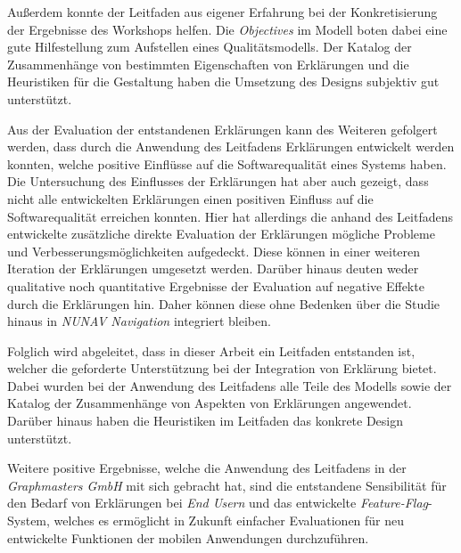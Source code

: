 Außerdem konnte der Leitfaden aus eigener Erfahrung bei der Konkretisierung der Ergebnisse des Workshops helfen. Die \textit{Objectives} im Modell boten dabei eine gute Hilfestellung zum Aufstellen eines Qualitätsmodells. Der Katalog der Zusammenhänge von bestimmten Eigenschaften von Erklärungen und die Heuristiken für die Gestaltung haben die Umsetzung des Designs subjektiv gut unterstützt.

Aus der Evaluation der entstandenen Erklärungen kann des Weiteren gefolgert werden, dass durch die Anwendung des Leitfadens Erklärungen entwickelt werden konnten, welche positive Einflüsse auf die Softwarequalität eines Systems haben. Die Untersuchung des Einflusses der Erklärungen hat aber auch gezeigt, dass nicht alle entwickelten Erklärungen einen positiven Einfluss auf die Softwarequalität erreichen konnten. Hier hat allerdings die anhand des Leitfadens entwickelte zusätzliche direkte Evaluation der Erklärungen mögliche Probleme und Verbesserungsmöglichkeiten aufgedeckt. Diese können in einer weiteren Iteration der Erklärungen umgesetzt werden. Darüber hinaus deuten weder qualitative noch quantitative Ergebnisse der Evaluation auf negative Effekte durch die Erklärungen hin. Daher können diese ohne Bedenken über die Studie hinaus in \textit{NUNAV Navigation} integriert bleiben.

Folglich wird abgeleitet, dass in dieser Arbeit ein Leitfaden entstanden ist, welcher die geforderte Unterstützung bei der Integration von Erklärung bietet. Dabei wurden bei der Anwendung des Leitfadens alle Teile des Modells sowie der Katalog der Zusammenhänge von Aspekten von Erklärungen angewendet. Darüber hinaus haben die Heuristiken im Leitfaden das konkrete Design unterstützt.

Weitere positive Ergebnisse, welche die Anwendung des Leitfadens in der \textit{Graphmasters GmbH} mit sich gebracht hat, sind die entstandene Sensibilität für den Bedarf von Erklärungen bei \textit{End Usern} und das entwickelte \textit{Feature-Flag}-System, welches es ermöglicht in Zukunft einfacher Evaluationen für neu entwickelte Funktionen der mobilen Anwendungen durchzuführen.
